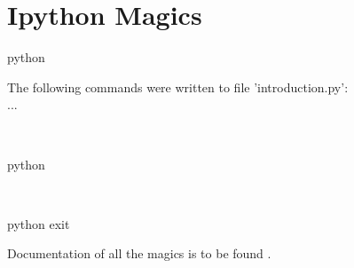 \documentclass[aspectratio=1610,slidestop]{beamer}
\begin{document}
\section{Ipython Magics}

\begin{pframe}
 \begin{ipython}
  \begin{pythonin}{python}
  \end{pythonin}
  \begin{pythonoutnonumber}
The following commands were written to file 'introduction.py':\\
...
  \end{pythonoutnonumber}\\
  \begin{pythonin}{python}
  \end{pythonin}
  \\

  \begin{pythonin}{python}
exit
  \end{pythonin}
 \end{ipython}

 Documentation of all the magics is to be found
  .
\end{pframe}
\end{document}
